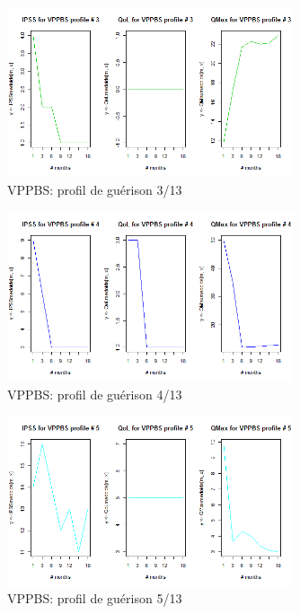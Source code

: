 \begin{figure}[H]
\centering
\includegraphics[width=0.75\textwidth]{../Fig/VPPBS/vppbs-profil-post-03.png}
\caption{VPPBS: profil de guérison 3/13}
\end{figure}

\begin{figure}[H]
\centering
\includegraphics[width=0.75\textwidth]{../Fig/VPPBS/vppbs-profil-post-04.png}
\caption{VPPBS: profil de guérison 4/13}
\end{figure}

\begin{figure}[H]
\centering
\includegraphics[width=0.75\textwidth]{../Fig/VPPBS/vppbs-profil-post-05.png}
\caption{VPPBS: profil de guérison 5/13}
\end{figure}

